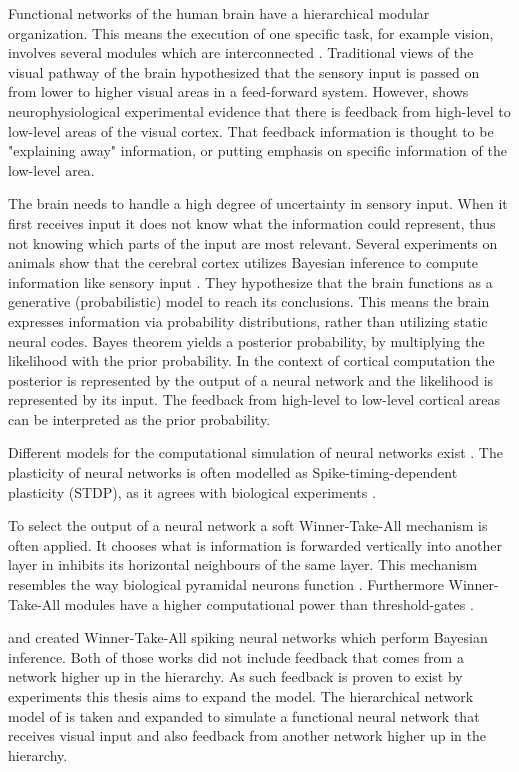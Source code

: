 Functional networks of the human brain have a hierarchical modular organization. This means the execution of one specific task, for example vision, involves several modules which are interconnected  \citep{hierarchicalBrain}. Traditional views of the visual pathway of the brain hypothesized that the sensory input is passed on from lower to higher visual areas in a feed-forward system. However, \citet{HierachicalBayesVisualCortex} shows  neurophysiological experimental evidence that there is feedback from high-level to low-level areas of the visual cortex. That feedback information is thought to be "explaining away" information, or putting emphasis on specific information of the low-level area. 
 
The brain needs to handle a high degree of uncertainty in sensory input. When it first receives input it does not know what the information could represent, thus not knowing which parts of the input are most relevant. Several experiments on animals show that the cerebral cortex utilizes Bayesian inference to compute information like sensory input \citep{neuralSubstrate, HierachicalBayesVisualCortex, anatomyOfInference}. They hypothesize that the brain functions as a generative (probabilistic) model to reach its conclusions. This means the brain expresses information via probability distributions, rather than utilizing static neural codes. Bayes theorem yields a posterior probability, by multiplying the likelihood with the prior probability. In the context of cortical computation the posterior is represented by the output of a neural network and the likelihood is represented by its input. The feedback from high-level to low-level cortical areas can be interpreted as the prior probability.

Different models for the computational simulation of neural networks exist  \citep{SpikingNeuronModelsBook}. The plasticity of neural networks is often modelled as Spike-timing-dependent plasticity (STDP), as it agrees with biological experiments \citep{STDPFELDMAN, STDPDAN}. 

To select the output of a neural network a soft Winner-Take-All mechanism is often applied. It chooses what is information is forwarded vertically into another layer in inhibits its horizontal neighbours of the same layer.  This mechanism resembles the way biological pyramidal neurons function \citep{softWTA}. Furthermore Winner-Take-All modules have a higher computational power than threshold-gates \citep{WTAPower}.

\citet{nessler} and \citet{nesslerClone} created Winner-Take-All spiking neural networks which perform Bayesian inference. Both of those works did not include feedback that comes from a network higher up in the hierarchy. As such feedback is proven to exist by experiments this thesis aims to expand the model. The hierarchical network model of \citet{nessler} is taken and expanded to simulate a functional neural network that receives visual input and also feedback from another network higher up in the hierarchy.

